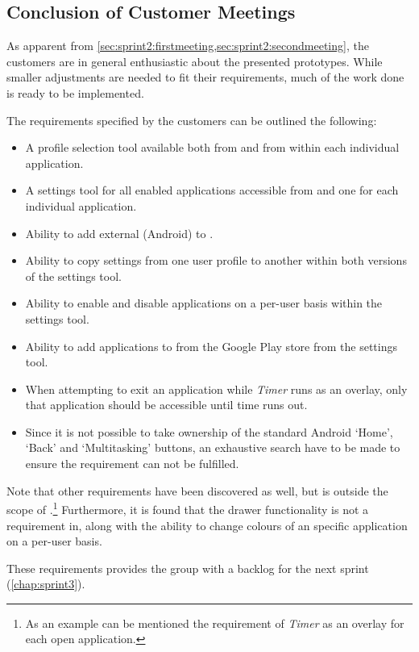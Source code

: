 \subsection{Conclusion of Customer Meetings}\label{sec:sprint2:conclusionmeetings}

As apparent from \cref{sec:sprint2:firstmeeting,sec:sprint2:secondmeeting}, the customers are in general enthusiastic about the presented prototypes.
While smaller adjustments are needed to fit their requirements, much of the work done is ready to be implemented.

The requirements specified by the customers can be outlined the following:

\begin{itemize}
\item A profile selection tool available both from \launcher and from within each individual application.
\item A settings tool for all enabled applications accessible from \launcher and one for each individual application.
\item Ability to add external (Android) to \launcher.
\item Ability to copy settings from one user profile to another within both versions of the settings tool.
\item Ability to enable and disable applications on a per-user basis within the \launcher settings tool.
\item Ability to add applications to \launcher from the Google Play store from the \launcher settings tool.
\item When attempting to exit an application while \textit{Timer} runs as an overlay, only that application should be accessible until time runs out.
\item Since it is not possible to take ownership of the standard Android `Home', `Back' and `Multitasking' buttons, an exhaustive search have to be made to ensure the requirement can not be fulfilled.
\end{itemize}

Note that other requirements have been discovered as well, but is outside the scope of \launcher.\footnote{As an example can be mentioned the requirement of \textit{Timer} as an overlay for each open application.}
Furthermore, it is found that the drawer functionality is not a requirement in, along with the ability to change colours of an specific application on a per-user basis.

These requirements provides the group with a backlog for the next sprint (\cref{chap:sprint3}).